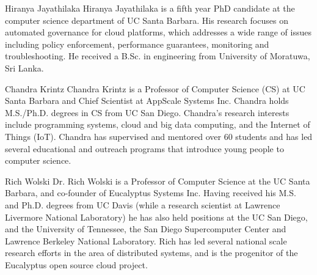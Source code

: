 \documentclass[10pt,journal,compsoc]{IEEEtran}
\begin{document}
\begin{IEEEbiography}{Hiranya Jayathilaka}
Hiranya Jayathilaka is a fifth year PhD candidate at the computer science department of UC Santa Barbara. His research focuses on automated governance
for cloud platforms, which addresses a wide range of issues including policy enforcement, performance guarantees, monitoring and troubleshooting. He received a
B.Sc. in engineering from University of Moratuwa, Sri Lanka. 
\end{IEEEbiography}

\begin{IEEEbiography}{Chandra Krintz}
Chandra Krintz is a Professor of Computer Science (CS) at UC Santa Barbara and Chief Scientist at AppScale Systems Inc. Chandra holds M.S./Ph.D. degrees in CS from UC San Diego.  Chandra's research interests include programming systems, cloud and big data computing, and the Internet of Things (IoT).  Chandra has supervised and mentored over 60 students and has led several educational and outreach programs that introduce young people to computer science.
\end{IEEEbiography}

\begin{IEEEbiography}{Rich Wolski}
Dr. Rich Wolski is a Professor of Computer Science at the UC Santa Barbara, and co-founder of Eucalyptus Systems Inc.  Having received his M.S. and Ph.D.  degrees from UC Davis (while a research scientist at Lawrence Livermore National Laboratory) he has also held positions at the UC San Diego, and the University of Tennessee, the San Diego Supercomputer Center and Lawrence Berkeley National Laboratory.  Rich has led several national scale research efforts in the area of distributed systems, and is the progenitor of the Eucalyptus open source cloud project.
\end{IEEEbiography}
\end{document}
